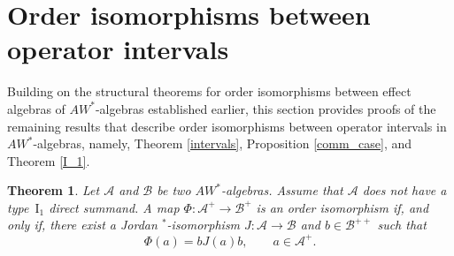 \documentclass[12pt]{amsart}
\newtheorem{thm}{Theorem}[section]
\theoremstyle{definition}
\theoremstyle{remark}
\numberwithin{equation}{section}
\begin{document}
\section{Order isomorphisms between operator intervals}\label{S4}


 
Building on the structural theorems for order isomorphisms between effect algebras of $AW^*$-algebras established earlier, this section provides proofs of the remaining results that describe order isomorphisms between operator intervals in $AW^*$-algebras, namely, Theorem \ref{intervals}, Proposition \ref{comm_case}, and Theorem \ref{I_1}.

\begin{thm}\label{A+}
Let $\mathcal{A}$ and $\mathcal{B}$ be two $AW^*$-algebras.  Assume that $\mathcal{A}$ does not have a type~$\mathrm{I}_1$ direct summand. A map $\Phi:\mathcal{A}^+\to\mathcal{B}^+$ is an order isomorphism if, and only if, there exist a Jordan $^*$-isomorphism $J:\mathcal{A}\to \mathcal{B}$ and $b\in\mathcal{B}^{++}$ such that $$\Phi(a)=bJ(a)b,\qquad a\in \mathcal{A}^+.$$
\end{thm}
\end{document}
